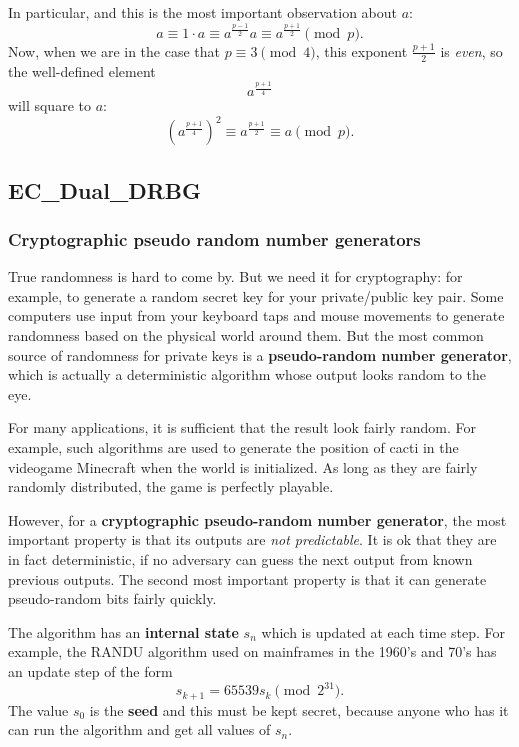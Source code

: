 \documentclass{article}
\theoremstyle{plain}
\theoremstyle{definition}
\theoremstyle{remark}
\numberwithin{theorem}{section}
\begin{document}
In particular, and this is the most important observation about $a$:
\[
\boxed{
a \equiv 1 \cdot a \equiv a^{\frac{p-1}{2}}a \equiv a^{\frac{p+1}{2}} \pmod{p}.
}
\]
Now, when we are in the case that $p \equiv 3 \pmod{4}$, this exponent $\frac{p+1}{2}$ is \emph{even}, so the well-defined element
\[
a^{\frac{p+1}{4}}
\]
will square to $a$:
\[
(a^{\frac{p+1}{4}})^2 \equiv
a^{\frac{p+1}{2}} \equiv a \pmod{p}.
\]





\subsection{EC\_Dual\_DRBG}

\subsubsection{Cryptographic pseudo random number generators}

True randomness is hard to come by.  But we need it for cryptography:  for example, to generate a random secret key for your private/public key pair.  Some computers use input from your keyboard taps and mouse movements to generate randomness based on the physical world around them.  But the most common source of randomness for private keys is a \textbf{pseudo-random number generator}, which is actually a deterministic algorithm whose output looks random to the eye.

For many applications, it is sufficient that the result look fairly random.  For example, such algorithms are used to generate the position of cacti in the videogame Minecraft when the world is initialized.  As long as they are fairly randomly distributed, the game is perfectly playable.

However, for a \textbf{cryptographic pseudo-random number generator}, the most important property is that its outputs are \emph{not predictable}.  It is ok that they are in fact deterministic, if no adversary can guess the next output from known previous outputs.  The second most important property is that it can generate pseudo-random bits fairly quickly.

The algorithm has an \textbf{internal state} $s_n$ which is updated at each time step.  For example, the RANDU algorithm used on mainframes in the 1960's and 70's has an update step of the form
\[
s_{k+1} = 65539 s_k \pmod{2^{31}}.
\]
The value $s_0$ is the \textbf{seed} and this must be kept secret, because anyone who has it can run the algorithm and get all values of $s_n$.
\end{document}
